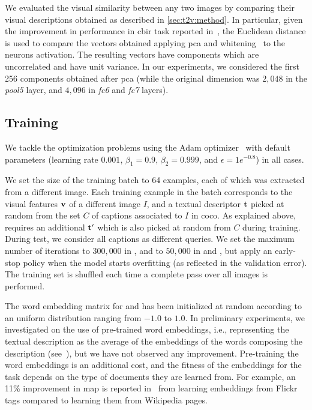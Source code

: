 We evaluated the visual similarity between any two images by comparing their visual descriptions obtained as described in \ref{sec:t2v:method}.
In particular, given the improvement in performance in \gls{cbir} task reported in~\cite{sharif2014cnn,gong2014multi,gordo2016deep}, the Euclidean distance is used to compare the vectors obtained applying \gls{pca} and whitening~\cite{comon1994independent} to the neurons activation.
The resulting vectors have components which are uncorrelated and have unit variance.
In our experiments, we considered the first 256 components obtained after \gls{pca} (while the original dimension was $2,048$ in the \emph{pool5} layer, and $4,096$ in \emph{fc6} and \emph{fc7} layers).


\subsection{Training}

We tackle the optimization problems using the Adam optimizer~\cite{kingma2014adam} with default parameters (learning rate $0.001$, $\beta_1=0.9$, $\beta_2=0.999$, and $\epsilon=1e^{-0.8}$) in all cases.

We set the size of the training batch to 64 examples, each of which was extracted from a different image.
Each training example in the batch corresponds to the visual features $\mathbf{v}$ of a different image $I$, and a textual descriptor $\mathbf{t}$ picked at random from the set $C$ of captions associated to $I$ in \gls{coco}.
As explained above, \sparsettv{} requires an additional $\mathbf{t}'$ which is also picked at random from $C$ during training.
During test, we consider all captions as different queries.
We set the maximum number of iterations to $300,000$ in \sparsettv{}, and to $50,000$ in \densettv{} and \widedeepttv{}, but apply an early-stop policy when the model starts overfitting (as reflected in the validation error).
The training set is shuffled each time a complete pass over all images is performed.

The word embedding matrix for \densettv{} and \widedeepttv{} has been initialized at random according to an uniform distribution ranging from $-1.0$ to $1.0$.
In preliminary experiments, we investigated on the use of pre-trained word embeddings, i.e.,  representing the textual description as the average of the embeddings of the words composing the description (see~\cite{dong2018predicting}), but we have not observed any improvement.
Pre-training the word embeddings is an additional cost, and the fitness of the embeddings for the task depends on the type of documents they are learned from.
For example, an 11\% improvement in \gls{map} is reported in~\cite{cappallo2015image2emoji} from learning embeddings from Flickr tags compared to learning them from Wikipedia pages.

